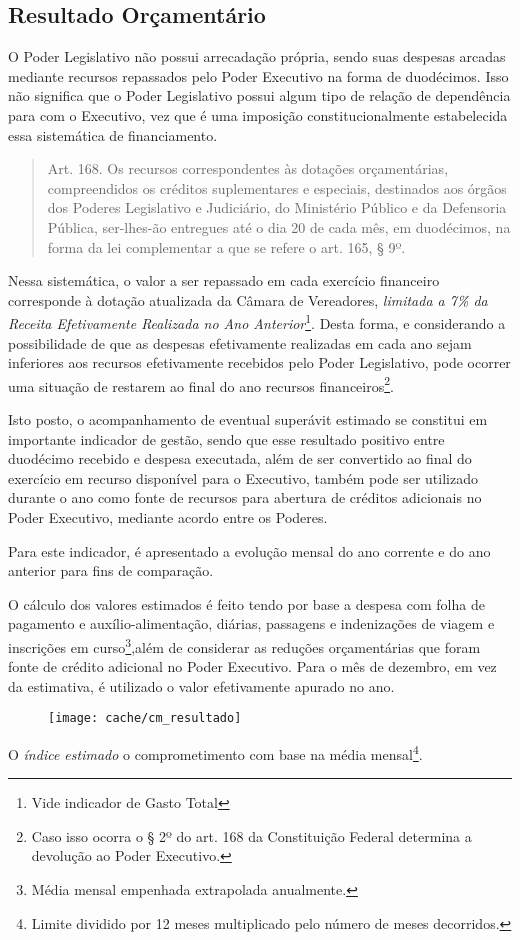 
\subsection[Resultado Orçamentário]{Resultado Orçamentário}

O Poder Legislativo não possui arrecadação própria, sendo suas despesas arcadas mediante recursos repassados pelo Poder Executivo na forma de duodécimos. Isso não significa que o Poder Legislativo possui algum tipo de relação de dependência para com o Executivo, vez que é uma imposição constitucionalmente estabelecida essa sistemática de financiamento.

\begin{quotation}
Art. 168. Os recursos correspondentes às dotações orçamentárias, compreendidos os créditos suplementares e especiais, destinados aos órgãos dos Poderes Legislativo e Judiciário, do Ministério Público e da Defensoria Pública, ser-lhes-ão entregues até o dia 20 de cada mês, em duodécimos, na forma da lei complementar a que se refere o art. 165, § 9º.
\end{quotation}

Nessa sistemática, o valor a ser repassado em cada exercício financeiro corresponde à dotação atualizada da Câmara de Vereadores, \textit{limitada a 7\% da Receita Efetivamente Realizada no Ano Anterior}\footnote{Vide indicador de Gasto Total}. Desta forma, e considerando a possibilidade de que as despesas efetivamente realizadas em cada ano sejam inferiores aos recursos efetivamente recebidos pelo Poder Legislativo, pode ocorrer uma situação de restarem ao final do ano recursos financeiros\footnote{Caso isso ocorra o § 2º do art. 168 da Constituição Federal determina a devolução ao Poder Executivo.}. 

Isto posto, o acompanhamento de eventual superávit estimado se constitui em importante indicador de gestão, sendo que esse resultado positivo entre duodécimo recebido e despesa executada, além de ser convertido ao final do exercício em recurso disponível para o Executivo, também pode ser utilizado durante o ano como fonte de recursos para abertura de créditos adicionais no Poder Executivo, mediante acordo entre os Poderes.



Para este indicador, é apresentado a evolução mensal do ano corrente e do ano anterior para fins de comparação.

O cálculo dos valores estimados é feito tendo por base a despesa com folha de pagamento e auxílio-alimentação, diárias, passagens e indenizações de viagem e inscrições em curso\footnote{Média mensal empenhada extrapolada anualmente.},além de considerar as reduções orçamentárias que foram fonte de crédito adicional no Poder Executivo.
Para o mês de dezembro, em vez da estimativa, é utilizado o valor efetivamente apurado no ano.

\begin{figure}
\center
\texttt{[image: cache/cm\_resultado]}
\end{figure}

O \textit{índice estimado} o comprometimento com base na média mensal\footnote{Limite dividido por 12 meses multiplicado pelo número de meses decorridos.}.